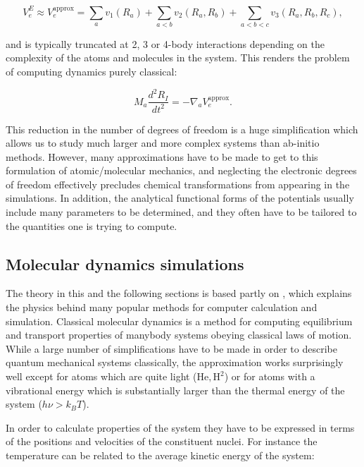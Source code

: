 \begin{equation}
 V_e^E \approx V_e^{\text{approx}} =
    \sum_a v_1(R_a) + \sum_{a < b} v_2(R_a, R_b)
    + \sum_{a < b < c} v_3(R_a, R_b, R_c) , 
\end{equation}

and is typically truncated at 2, 3 or 4-body interactions
depending on the complexity of the atoms and molecules in the system.
This renders the problem of computing dynamics purely classical:

\begin{equation}
 M_a \frac{d^2 R_I}{dt^2} = -\nabla_a V_e^{\text{approx}} . 
\end{equation}

This reduction in the number of degrees of freedom is a huge simplification
which allows us to study much larger and more complex systems
than ab-initio methods. However, many approximations have to be made
to get to this formulation of atomic/molecular mechanics, and neglecting
the electronic degrees of freedom effectively precludes chemical
transformations from appearing in the simulations.
In addition, the analytical functional forms of the potentials
usually include many parameters to be determined,
and they often have to be tailored to the quantities
one is trying to compute.

\subsection{Molecular dynamics simulations}
The theory in this and the following sections
is based partly on \parencite[Frenkel, Daan
and Smit, Berend][pages 63-107]{frenkel2001understanding},
which explains the physics behind many popular methods 
for computer calculation and simulation.
Classical molecular dynamics is a method
for computing equilibrium and transport properties
of manybody systems obeying classical laws of motion.
While a large number of simplifications have to be made
in order to describe quantum mechanical systems classically,
the approximation works surprisingly well
except for atoms which are quite light ($\text{He}, \text{H}^2$)
or for atoms with a vibrational energy
which is substantially larger than the thermal energy
of the system ($h\nu > k_B T$).
\par
In order to calculate properties of the system
they have to be expressed in terms of the positions
and velocities of the constituent nuclei.
For instance the temperature can be related
to the average kinetic energy of the system:

